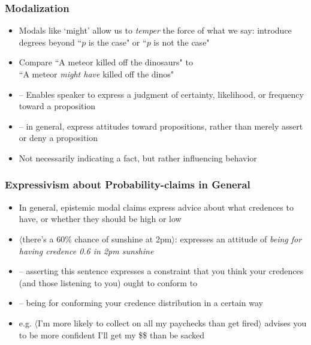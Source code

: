 \begin{frame}
\frametitle{Modalization}

\begin{itemize}[<+->]

\item Modals like `might' allow us to \textit{temper} the force of what we say: introduce degrees beyond ``$p$ is the case" or ``$p$ is not the case"

\item Compare ``A meteor killed off the dinosaurs" to \\ ``A meteor \textit{might have} killed off the dinos"

\item[] -- Enables speaker to express a judgment of certainty, likelihood, or frequency toward a proposition

\item[] -- in general, express attitudes toward propositions, rather than merely assert or deny a proposition 

\item Not necessarily indicating a fact, but rather influencing behavior

\end{itemize}
\end{frame}

\begin{frame}
\frametitle{Expressivism about Probability-claims in General}


\begin{itemize}[<+->]


\item In general, epistemic modal claims express advice about what credences to have, or whether they should be high or low

\item $\langle$there's a 60\% chance of sunshine at 2pm$\rangle$: expresses an attitude of \textit{being for having credence 0.6 in 2pm sunshine}

\item[] -- asserting this sentence expresses a constraint that you think your credences (and those listening to you) ought to conform to

\item[] -- being for conforming your credence distribution in a certain way 

\item e.g. $\langle$I'm more likely to collect on all my paychecks than get fired$\rangle$ advises you to be more confident I'll get my \$\$ than be sacked 


\end{itemize}
\end{frame}

